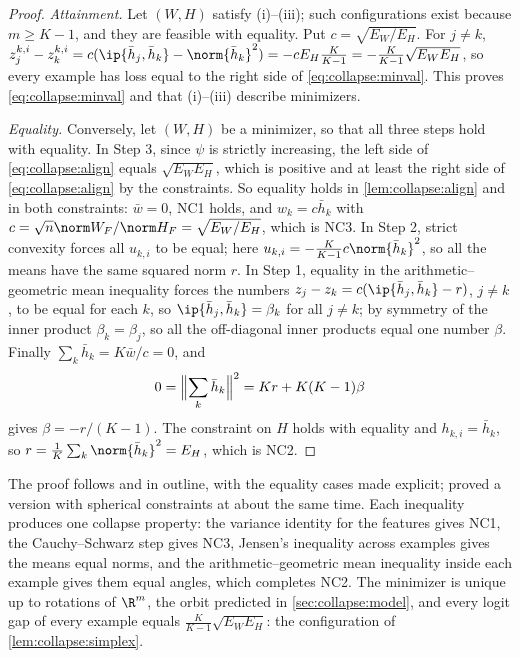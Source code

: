 \begin{refsection}
\begin{proof}
\emph{Attainment.} Let $(W,H)$ satisfy (i)--(iii); such configurations exist because $m\ge K-1$, and they are feasible with equality. Put $c=\sqrt{E_W/E_H}$. For $j\ne k$, $z^{k,i}_j-z^{k,i}_k=c(\ip{\bar h_j,\bar h_k}-\norm{\bar h_k}^2)=-cE_H\frac K{K-1}=-\frac K{K-1}\sqrt{E_WE_H}$, so every example has loss equal to the right side of \eqref{eq:collapse:minval}. This proves \eqref{eq:collapse:minval} and that (i)--(iii) describe minimizers.

\emph{Equality.} Conversely, let $(W,H)$ be a minimizer, so that all three steps hold with equality. In Step 3, since $\psi$ is strictly increasing, the left side of \eqref{eq:collapse:align} equals $\sqrt{E_WE_H}$, which is positive and at least the right side of \eqref{eq:collapse:align} by the constraints. So equality holds in \cref{lem:collapse:align} and in both constraints: $\bar w=0$, NC1 holds, and $w_k=c\bar h_k$ with $c=\sqrt n\norm W_F/\norm H_F=\sqrt{E_W/E_H}$, which is NC3. In Step 2, strict convexity forces all $u_{k,i}$ to be equal; here $u_{k,i}=-\frac K{K-1}c\norm{\bar h_k}^2$, so all the means have the same squared norm $r$. In Step 1, equality in the arithmetic--geometric mean inequality forces the numbers $z_j-z_k=c(\ip{\bar h_j,\bar h_k}-r)$, $j\ne k$, to be equal for each $k$, so $\ip{\bar h_j,\bar h_k}=\beta_k$ for all $j\ne k$; by symmetry of the inner product $\beta_k=\beta_j$, so all the off-diagonal inner products equal one number $\beta$. Finally $\sum_k\bar h_k=K\bar w/c=0$, and
\[
  0=\Bigl\|\sum_k\bar h_k\Bigr\|^2=Kr+K(K-1)\beta
\]
gives $\beta=-r/(K-1)$. The constraint on $H$ holds with equality and $h_{k,i}=\bar h_k$, so $r=\frac1K\sum_k\norm{\bar h_k}^2=E_H$, which is NC2.
\end{proof}

The proof follows \textcite{FangEtAl2021} and \textcite{LuSteinerberger2022} in outline, with the equality cases made explicit; \textcite{GrafEtAl2021} proved a version with spherical constraints at about the same time. Each inequality produces one collapse property: the variance identity for the features gives NC1, the Cauchy--Schwarz step gives NC3, Jensen's inequality across examples gives the means equal norms, and the arithmetic--geometric mean inequality inside each example gives them equal angles, which completes NC2. The minimizer is unique up to rotations of $\R^m$, the orbit predicted in \cref{sec:collapse:model}, and every logit gap of every example equals $\frac K{K-1}\sqrt{E_WE_H}$: the configuration of \cref{lem:collapse:simplex}.


\end{refsection}
